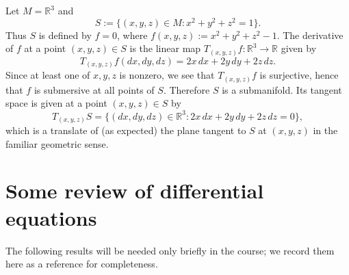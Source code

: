 \documentclass[reqno]{amsart} 
\begin{document}
\begin{example}
  Let $M = \mathbb{R}^3$
  and
  \begin{equation*}
    S := \{(x,y,z)  \in M : x^2 + y^2 + z^2 = 1\}.
  \end{equation*}
  Thus $S$ is defined by $f = 0$,
  where $f(x,y,z) := x^2 + y^2 + z^2 - 1$.
  The derivative of $f$ at a point $(x,y,z) \in S$ is
  the linear map $T_{(x,y,z)}f : \mathbb{R}^3 \rightarrow
  \mathbb{R}$
  given by
  \begin{equation*}
    T_{(x,y,z)} f(d x, d y, d z)
    =
    2 x \, d x + 2 y \, d y + 2 z \, d z.
  \end{equation*}
  Since at least one of $x,y,z$ is nonzero,
  we see that $T_{(x,y,z)} f$ is surjective,
  hence that $f$ is submersive
  at all points of $S$.
  Therefore $S$ is a submanifold.
  Its tangent space
  is given at a point $(x,y,z) \in S$ by
  \begin{equation*}
    T_{(x,y,z)} S
    = \{(d x , d y , d z) \in \mathbb{R}^3 :
    2 x \, d x + 2 y \, d y + 2 z \, d z = 0
    \},
  \end{equation*}
  which is a translate of  (as expected)  the plane tangent to $S$ at $(x,y,z)$ in the familiar geometric sense.
\end{example}

\section{Some review of differential equations\label{sec:diffeq}}
\label{sec:orgec9f688}
The following results will be needed only briefly in the
course;
we record them here as a reference for completeness.  
\end{document}
